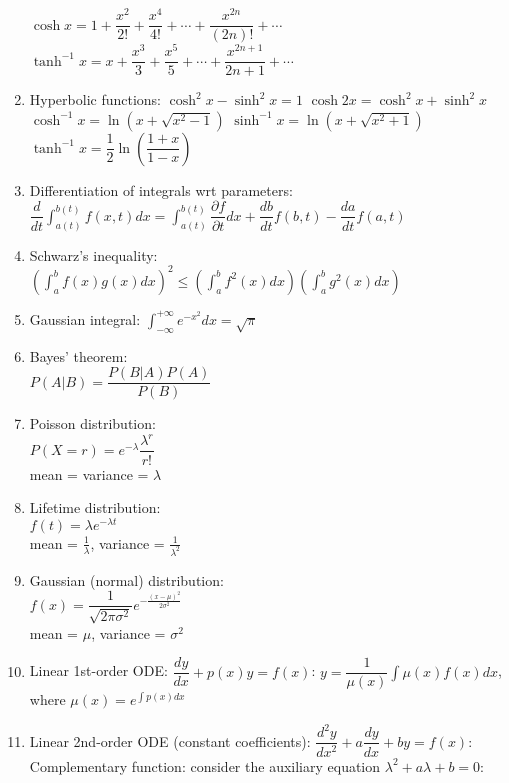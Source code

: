 \documentclass[fleqn]{article}
\begin{document}
\begin{enumerate}
        $\cosh x=1+\dfrac{x^2}{2!}+\dfrac{x^4}{4!}+\cdots+\dfrac{x^{2n}}{(2n)!}+\cdots$\smallbreak
        $\tanh^{-1}x=x+\dfrac{x^3}{3}+\dfrac{x^5}{5}+\cdots+\dfrac{x^{2n+1}}{2n+1}+\cdots$
    \item Hyperbolic functions:\smallbreak
        $\cosh^2 x-\sinh^2 x=1$\smallbreak
        $\cosh2x=\cosh^2 x+\sinh^2 x$\smallbreak
        $\cosh^{-1}x=\ln(x+\sqrt{x^2-1})$\smallbreak
        $\sinh^{-1}x=\ln(x+\sqrt{x^2+1})$\smallbreak
        $\tanh^{-1}x=\dfrac{1}{2}\ln\left(\dfrac{1+x}{1-x}\right)$
    \item Differentiation of integrals wrt parameters:\smallbreak
        $\dfrac{d}{dt}\displaystyle\int_{a(t)}^{b(t)}f(x,t)dx=\displaystyle\int_{a(t)}^{b(t)}\dfrac{\partial f}{\partial t}dx+\dfrac{db}{dt}f(b,t)-\dfrac{da}{dt}f(a,t)$
    \item Schwarz's inequality:\smallbreak
        $\left(\displaystyle\int_a^b f(x)g(x)dx\right)^2\leq\left(\displaystyle\int_a^b f^2(x)dx\right)\left(\displaystyle\int_a^b g^2(x)dx\right)$
    \item Gaussian integral:\smallbreak
        $\displaystyle\int_{-\infty}^{+\infty}e^{-x^2}dx=\sqrt{\pi}$
    \item Bayes' theorem:\\
        $P(A|B)=\dfrac{P(B|A)P(A)}{P(B)}$
    \item Poisson distribution:\\
        $P(X=r)=e^{-\lambda}\dfrac{\lambda^r}{r!}$\\
        mean = variance = $\lambda$
    \item Lifetime distribution:\\
        $f(t)=\lambda e^{-\lambda t}$\\
        mean = $\frac{1}{\lambda}$, variance = $\frac{1}{\lambda^2}$\\
    \item Gaussian (normal) distribution:\\
        $f(x)=\dfrac{1}{\sqrt{2\pi\sigma^2}}e^{-\frac{(x-\mu)^2}{2\sigma^2}}$\\
        mean = $\mu$, variance = $\sigma^2$
    \item Linear 1st-order ODE:\smallbreak
        $\dfrac{dy}{dx}+p(x)y=f(x)$:\smallbreak
        $y=\dfrac{1}{\mu(x)}\displaystyle\int\mu(x)f(x)dx$, where $\mu(x)=e^{\int p(x)dx}$
    \item Linear 2nd-order ODE (constant coefficients):\smallbreak
        $\dfrac{d^2y}{dx^2}+a\dfrac{dy}{dx}+by=f(x)$:\smallbreak
        Complementary function: consider the auxiliary equation $\lambda^2+a\lambda+b=0$:

\end{enumerate}
\end{document}
